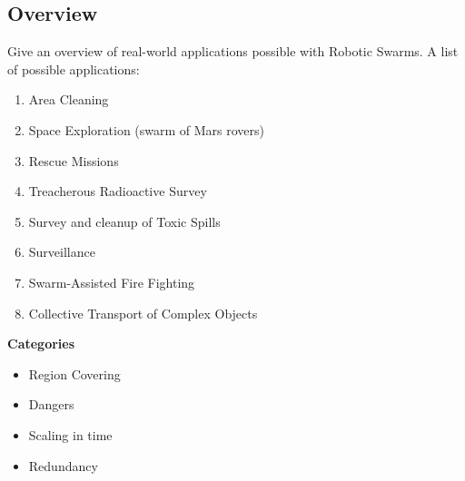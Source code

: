   
  \subsection{Overview}
  Give an overview of real-world applications possible with Robotic Swarms. A list of possible applications:
    \begin{enumerate}
      \item Area Cleaning
      \item Space Exploration (swarm of Mars rovers)
      \item Rescue Missions
      \item Treacherous Radioactive Survey
      \item Survey and cleanup of Toxic Spills
      \item Surveillance
      \item Swarm-Assisted Fire Fighting
     \item Collective Transport of Complex Objects
    \end{enumerate}
  \textbf{Categories}
    \begin{itemize}
      \item Region Covering
      \item Dangers
      \item Scaling in time
      \item Redundancy
    \end{itemize}
  